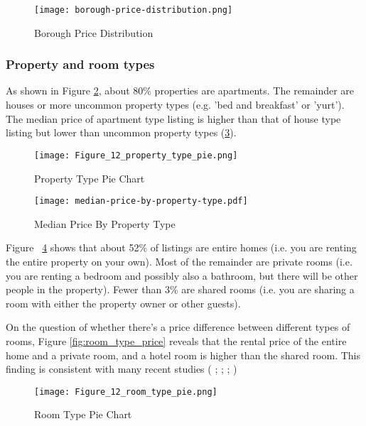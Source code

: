 \begin{figure}[!htbp]\centering
    \texttt{[image: borough-price-distribution.png]}
    \caption{Borough Price Distribution}
    \label{fig:borough-price-distribution}
\end{figure}

\subsubsection*{Property and room types}

As shown in Figure \ref{fig:property_type},
about 80\% properties are apartments. The remainder are houses or more uncommon
property types (e.g. 'bed and breakfast' or 'yurt'). The median price of
apartment type listing is higher than that of house type listing but lower than
uncommon property types (\ref{fig:property_type_price}).

\begin{figure}[!htbp]
    \centering
        \centering
        \caption{Property Type Pie Chart}
        \texttt{[image: Figure\_12\_property\_type\_pie.png]}
      \label{fig:property_type}
\end{figure}

\begin{figure}[!htbp]
        \centering
        \texttt{[image: median-price-by-property-type.pdf]}
        \caption{Median Price By Property Type}
        \label{fig:property_type_price}
\end{figure}

Figure ~\ref{fig:room_type_pie} shows that about 52\% of listings are entire homes
(i.e. you are renting the entire property on your own). Most of the remainder
are private rooms (i.e. you are renting a bedroom and possibly also a bathroom,
but there will be other people in the property). Fewer than 3\% are shared rooms
(i.e. you are sharing a room with either the property owner or other guests).

On the question of whether there's a price difference between different types of
rooms, Figure \ref{fig:room_type_price} reveals that the rental price of the
entire home and a private room, and a hotel room is higher than the shared room.
This finding is consistent with many recent studies (\cite{cai2019price} ;
\cite{benitez2018flexible}; \cite{chen2017consumer}; \cite{gibbs2018use})

\begin{figure}[!htbp]
    \centering
        \centering
        \texttt{[image: Figure\_12\_room\_type\_pie.png]}
        \caption{Room Type Pie Chart}
        \label{fig:room_type_pie}
\end{figure}

